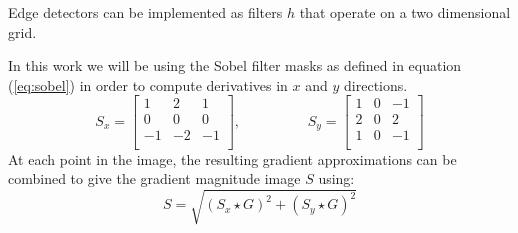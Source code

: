 		
		Edge detectors can be implemented as filters $h$ that operate on a two dimensional grid. 
%		
%				
%			
			
		In this work we will be using the Sobel filter masks as defined in equation (\ref{eq:sobel}) in order to compute derivatives in $x$ and $y$ directions. 
		\begin{equation}
			S_x =
			 \begin{bmatrix}
     				1	& 2 & 1 \\
    					0	 & 0 & 0 \\
    					-1	 & -2 & -1 \\
				\end{bmatrix},
			\hspace{2cm}
			S_y = 
				\begin{bmatrix}
     				1	& 0 & -1 \\
    					2	 & 0 & 2 \\
    					1	 & 0 & -1 \\
				\end{bmatrix}
			\label{eq:sobel}
			\end{equation}
		At each point in the image, the resulting gradient approximations can be combined to give the gradient magnitude image $S$ using:
		\begin{equation}
			S = \sqrt{(S_x \star G )^2 + (S_y \star G)^2}
			\label{eq:grad_sobel}
		\end{equation}


